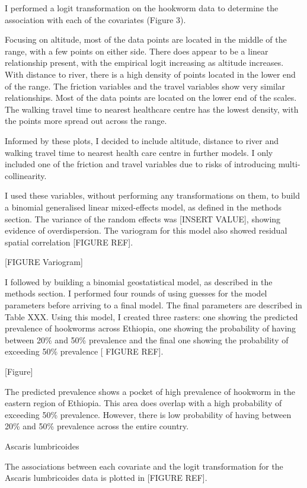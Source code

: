 \documentclass[
]{article}
\begin{document}
I performed a logit transformation on the hookworm data to determine the
association with each of the covariates (Figure 3).

Focusing on altitude, most of the data points are located in the middle
of the range, with a few points on either side. There does appear to be
a linear relationship present, with the empirical logit increasing as
altitude increases. With distance to river, there is a high density of
points located in the lower end of the range. The friction variables and
the travel variables show very similar relationships. Most of the data
points are located on the lower end of the scales. The walking travel
time to nearest healthcare centre has the lowest density, with the
points more spread out across the range.

Informed by these plots, I decided to include altitude, distance to
river and walking travel time to nearest health care centre in further
models. I only included one of the friction and travel variables due to
risks of introducing multi-collinearity.

I used these variables, without performing any transformations on them,
to build a binomial generalised linear mixed-effects model, as defined
in the methods section. The variance of the random effects was {[}INSERT
VALUE{]}, showing evidence of overdispersion. The variogram for this
model also showed residual spatial correlation {[}FIGURE REF{]}.

{[}FIGURE Variogram{]}

I followed by building a binomial geostatistical model, as described in
the methods section. I performed four rounds of using guesses for the
model parameters before arriving to a final model. The final parameters
are described in Table XXX. Using this model, I created three rasters:
one showing the predicted prevalence of hookworms across Ethiopia, one
showing the probability of having between 20\% and 50\% prevalence and
the final one showing the probability of exceeding 50\% prevalence {[}
FIGURE REF{]}.

{[}Figure{]}

The predicted prevalence shows a pocket of high prevalence of hookworm
in the eastern region of Ethiopia. This area does overlap with a high
probability of exceeding 50\% prevalence. However, there is low
probability of having between 20\% and 50\% prevalence across the entire
country.

Ascaris lumbricoides

The associations between each covariate and the logit transformation for
the Ascaris lumbricoides data is plotted in {[}FIGURE REF{]}.
\end{document}
